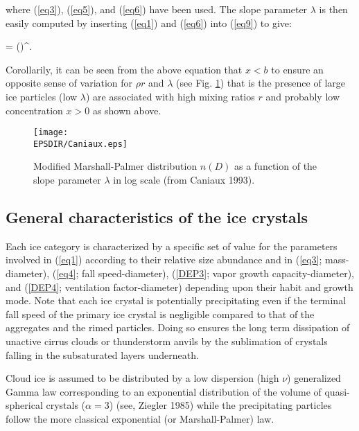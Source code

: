 \begin{itemize}
\noindent where (\ref{eq3}), (\ref{eq5}), and (\ref{eq6}) have been used. The
slope parameter $\lambda$ is then easily computed by inserting (\ref{eq1}) and
(\ref{eq6}) into (\ref{eq9}) to give:

%
\be\label{eq10}
\lambda = \Big(\Big)^{}.
\ee
%

Corollarily, it can be seen from the above equation that $x<b$ to ensure an
opposite sense of variation for $\rho r$ and $\lambda$ (see Fig. \ref{mixfigCaniaux})
that is the presence of large ice particles (low $\lambda$)
are associated with high mixing ratios $r$ and probably low concentration
$x>0$ as shown above.

\end{itemize}

\begin{figure}
\centerline{\texttt{[image: \\EPSDIR/Caniaux.eps]}}
\caption{Modified Marshall-Palmer distribution $n(D)$ as a
function of the slope parameter $\lambda$ in log scale (from Caniaux 1993).}
\label{mixfigCaniaux}
\end{figure}

%
\subsection{General characteristics of the ice crystals}
%

Each ice category is characterized by a specific set of value for the parameters
involved in (\ref{eq1}) according to their relative size abundance and in
(\ref{eq3}; mass-diameter), (\ref{eq4}; fall speed-diameter), (\ref{DEP3};
vapor growth capacity-diameter), and (\ref{DEP4}; ventilation factor-diameter)
depending upon their habit and growth mode. Note that each ice
crystal is potentially precipitating even if the terminal fall speed of the
primary ice crystal is negligible compared to that of the aggregates and the
rimed particles. Doing so ensures the long term dissipation of unactive cirrus
clouds or thunderstorm anvils by the sublimation of crystals falling in
the subsaturated layers underneath.

Cloud ice is assumed to be distributed by a low dispersion (high $\nu$)
generalized Gamma law corresponding to an exponential distribution of the volume
of quasi-spherical crystals ($\alpha = 3$) (see, Ziegler 1985) while the
precipitating particles follow the more classical exponential (or
Marshall-Palmer) law.

